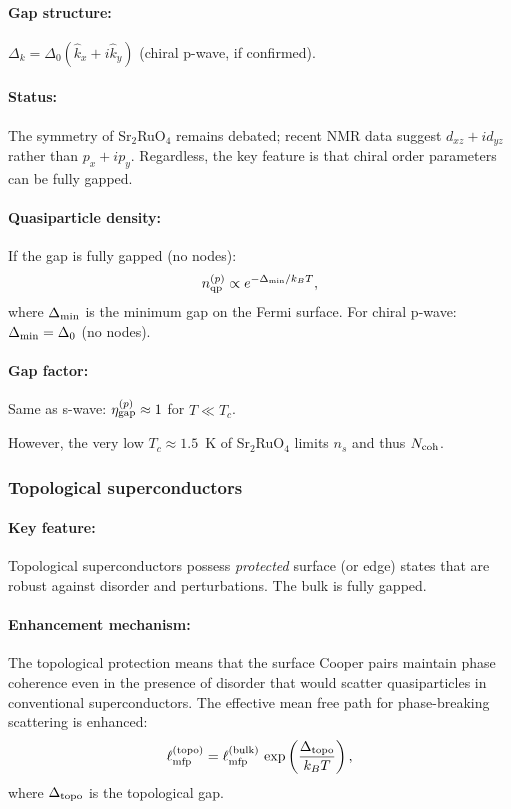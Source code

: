 \documentclass[12pt,aps,prd,twocolumn,superscriptaddress,nofootinbib]{revtex4-2}
\begin{document}
\paragraph{Gap structure:} $\Delta_k = \Delta_0(\hat{k}_x + i\hat{k}_y)$
(chiral p-wave, if confirmed).

\paragraph{Status:} The symmetry of Sr$_2$RuO$_4$ remains debated;
recent NMR data suggest $d_{xz} + id_{yz}$ rather than $p_x + ip_y$.
Regardless, the key feature is that chiral order parameters can be
fully gapped.

\paragraph{Quasiparticle density:}
If the gap is fully gapped (no nodes):
\begin{equation}\label{eq:nqp-pwave}
n_{\rm qp}^{(p)} \propto e^{-\Delta_{\rm min}/k_BT},
\end{equation}
where $\Delta_{\rm min}$ is the minimum gap on the Fermi surface.
For chiral p-wave: $\Delta_{\rm min} = \Delta_0$ (no nodes).

\paragraph{Gap factor:} Same as s-wave: $\eta_{\rm gap}^{(p)} \approx 1$
for $T \ll T_c$.

However, the very low $T_c \approx 1.5$~K of Sr$_2$RuO$_4$ limits
$n_s$ and thus $N_{\rm coh}$.

\subsubsection{Topological superconductors}

\paragraph{Key feature:} Topological superconductors possess
\emph{protected} surface (or edge) states that are robust against
disorder and perturbations. The bulk is fully gapped.

\paragraph{Enhancement mechanism:} The topological protection means
that the surface Cooper pairs maintain phase coherence even in the
presence of disorder that would scatter quasiparticles in conventional
superconductors. The effective mean free path for phase-breaking
scattering is enhanced:
\begin{equation}\label{eq:mfp-topological}
\ell_{\rm mfp}^{(\rm topo)} = \ell_{\rm mfp}^{(\rm bulk)}\,
\exp\left(\frac{\Delta_{\rm topo}}{k_BT}\right),
\end{equation}
where $\Delta_{\rm topo}$ is the topological gap.
\end{document}
